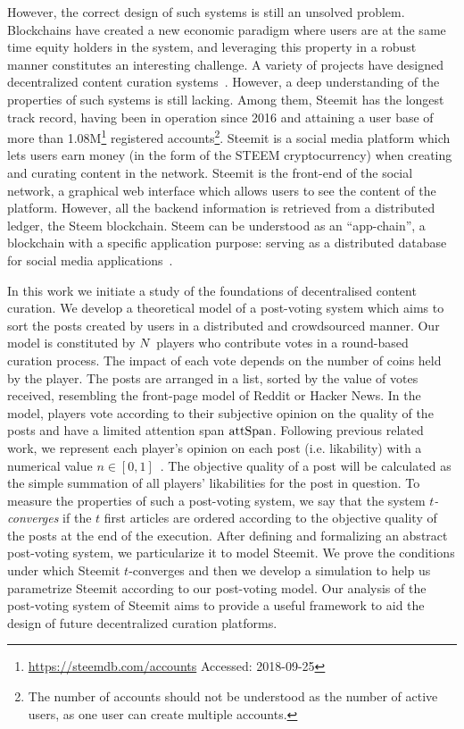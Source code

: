    However, the correct design of such systems is still an unsolved problem. Blockchains have created a new economic paradigm where users are at the same time equity holders in the system, and leveraging this property in a robust manner constitutes an interesting challenge.
   A variety of projects have designed decentralized content curation systems~\cite{synereo,steemit,tcr}. However, a deep understanding of the properties of such systems is still lacking. Among them, Steemit
has the longest track record, having been in operation since 2016 and attaining a user base of more than 1.08M\footnote{\url{https://steemdb.com/accounts} Accessed: 2018-09-25} registered accounts\footnote{The number of accounts should not be understood as the number of active users, as one user can create multiple accounts.}. Steemit is a social media platform which lets users earn money (in the form of the STEEM cryptocurrency) when creating and curating content in the network. Steemit is the front-end of the social network, a graphical web interface which allows users to see the content of the platform. However, all the backend information is retrieved from a distributed ledger, the Steem blockchain. Steem can be understood as an ``app-chain'', a blockchain with a specific application purpose: serving as a distributed database for social media applications~\cite{steemit}.

In this work we initiate a study of the foundations of decentralised content curation. We develop a theoretical model of a post-voting system which aims to sort the posts created by users in a distributed and crowdsourced manner.
  Our model is constituted by $N$ players who contribute votes in a round-based curation process. The impact of each vote depends on the number of coins held by the player.
   The posts are arranged in a list, sorted by the value of votes received, resembling the front-page model of Reddit or Hacker News. In the model, players vote according to their subjective opinion on the quality of the posts and have a limited attention span $\mathrm{attSpan}$.
   Following previous related work, we represent each player's opinion on each post (i.e. likability) with a numerical value $n \in [ 0,1 ]$~\cite{ghosh2011incentivizing,askalidis2013theoretical}.
   The objective quality of a post will be calculated as the simple summation of all players' likabilities for the post in question. To measure the properties of such a post-voting system, we say that the system \textit{$t$-converges} if the $t$ first articles are ordered according to the objective quality of the posts at the end of the execution.
  After defining and formalizing an abstract post-voting system, we particularize it to model Steemit.
   We prove the conditions under which Steemit $t$-converges and then we develop a simulation to help us parametrize Steemit according to our post-voting model.
   Our analysis of the post-voting system of Steemit aims to provide a useful framework to aid the design of future decentralized curation platforms. 

